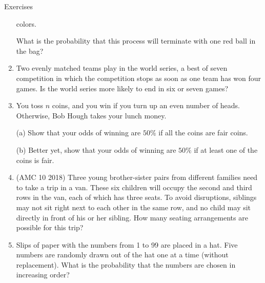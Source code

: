 \begin{xcb}{Exercises}
\begin{enumerate}
colors.\par
What is the probability that this process will terminate with one red ball in the bag?
\begin{hint}
\end{hint}
\item {} Two evenly matched teams play in the world series, a best of seven competition in which the competition stops as soon as one team has won four games. Is the world series more likely to end in six or seven games?
\item You toss $n$ coins, and you win if you turn up an even number of heads. Otherwise, Bob Hough takes your lunch money.\par
(a)  Show that your odds of winning are $50\%$ if all the coins are fair coins.\par
(b)  Better yet, show that your odds of winning are $50\%$ if at least one of the coins is
fair.\par
\item(AMC 10 2018)  Three young brother-sister pairs from different families need to take a trip in a van. These six children will occupy the second and third rows in the van, each of which has three seats. To avoid disruptions, siblings may not sit right next to each other in the same row, and no child may sit directly in front of his or her sibling. How many seating arrangements are possible for this trip?
\item Slips of paper with the numbers from 1 to 99 are placed in a hat. Five numbers are randomly drawn out of the hat one at a time (without replacement). What is the probability that the numbers are chosen in increasing order?
\end{enumerate}
\end{xcb}